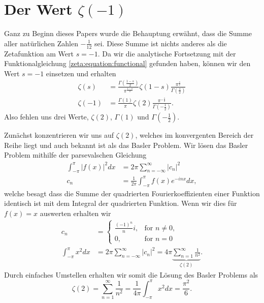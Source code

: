 \section{Der Wert $\zeta(-1)$} \label{zeta:section:fazit}

Ganz zu Beginn dieses Papers wurde die Behauptung erwähnt, dass die Summe aller natürlichen Zahlen $-\frac{1}{12}$ sei.
Diese Summe ist nichts anderes als die Zetafunktion am Wert $s=-1$.
Da wir die analytische Fortsetzung mit der Funktionalgleichung \eqref{zeta:equation:functional} gefunden haben, können wir den Wert $s=-1$ einsetzen und erhalten
\begin{align*}
    \zeta(s)
    &=
    \frac{\Gamma \left( \frac{1-s}{2} \right)}{\pi^{\frac{1-s}{2}}}
    \zeta(1-s)
    \frac{\pi^{\frac{s}{2}}}{\Gamma \left( \frac{s}{2} \right)}
    \\
    \zeta(-1)
    &=
    \frac{\Gamma(1)}{\pi}
    \zeta(2)
    \frac{\pi^{-\frac{1}{2}}}{\Gamma \left( -\frac{1}{2} \right)}.
\end{align*}
Also fehlen uns drei Werte, $\zeta(2)$, $\Gamma(1)$ und $\Gamma(-\frac{1}{2})$.

Zunächst konzentrieren wir uns auf $\zeta(2)$, welches im konvergenten Bereich der Reihe liegt und auch bekannt ist als das Basler Problem.
Wir lösen das Basler Problem \cite{zeta:online:basel} mithilfe der parsevalschen Gleichung \cite{zeta:online:pars}
\begin{align}
    \int_{-\pi}^{\pi} |f(x)|^2 dx
    &=
    2\pi \sum_{n=-\infty}^{\infty} |c_n|^2 \\
    c_n
    &=
    \frac{1}{2\pi}
    \int_{-\pi}^{\pi}f(x)e^{-inx} dx,
\end{align}
welche besagt dass die Summe der quadrierten Fourierkoeffizienten einer Funktion identisch ist mit dem Integral der quadrierten Funktion.
Wenn wir dies für $f(x) = x$ auswerten erhalten wir
\begin{align}
    c_n
    &=
    \begin{cases}
        \frac{(-1)^n}{n} i, & \text{for } n\neq0, \\
        0, & \text{for } n=0
    \end{cases}
    \\
    \int_{-\pi}^{\pi} x^2 dx
    &=
    2\pi \sum_{n=-\infty}^{\infty} |c_n|^2
    =
    4\pi \underbrace{\sum_{n=1}^{\infty} \frac{1}{n^2}}_{\displaystyle{\zeta(2)}}.
\end{align}
Durch einfaches Umstellen erhalten wir somit die Lösung des Basler Problems als
\begin{equation}
    \zeta(2) = \sum_{n=1}^{\infty} \frac{1}{n^2} = \frac{1}{4\pi}
    \int_{-\pi}^{\pi} x^2 dx
    = \frac{\pi^2}{6}.
\end{equation}

